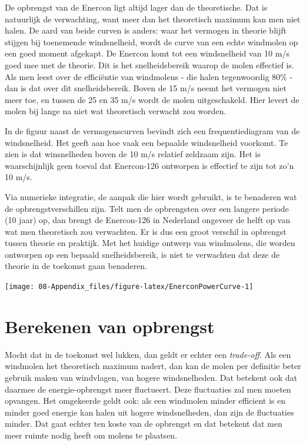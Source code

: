 \documentclass[
  11pt,
  a4paper,
]{book}
\begin{document}
\medskip

De opbrengst van de Enercon ligt altijd lager dan de theoretische. Dat is natuurlijk de verwachting, want meer dan het theoretisch maximum kan men niet halen. De aard van beide curven is anders: waar het vermogen in theorie blijft stijgen bij toenemende windsnelheid, wordt de curve van een echte windmolen op een goed moment afgekapt. De Enercon komt tot een windsnelheid van 10 m/s goed mee met de theorie. Dit is het snelheidsbereik waarop de molen effectief is. Als men leest over de efficiëntie van windmolens - die halen tegenwoordig 80\% - dan is dat over dit snelheidsbereik. Boven de 15 m/s neemt het vermogen niet meer toe, en tussen de 25 en 35 m/s wordt de molen uitgeschakeld. Hier levert de molen bij lange na niet wat theoretisch verwacht zou worden.

\medskip

In de figuur naast de vermogenscurven bevindt zich een frequentiediagram van de windsnelheid. Het geeft aan hoe vaak een bepaalde windsnelheid voorkomt. Te zien is dat winsnelheden boven de 10 m/s relatief zeldzaam zijn. Het is waarschijnlijk geen toeval dat Enercon-126 ontworpen is effectief te zijn tot zo'n 10 m/s.

\medskip

Via numerieke integratie, de aanpak die hier wordt gebruikt, is te benaderen wat de opbrengstverschillen zijn. Telt men de opbrengsten over een langere periode (10 jaar) op, dan brengt de Enercon-126 in Nederland ongeveer de helft op van wat men theoretisch zou verwachten. Er is dus een groot verschil in opbrengst tussen theorie en praktijk. Met het huidige ontwerp van windmolens, die worden ontworpen op een bepaald snelheidsbereik, is niet te verwachten dat deze de theorie in de toekomst gaan benaderen.

\bigskip

\begin{center}\texttt{[image: 08-Appendix\_files/figure-latex/EnerconPowerCurve-1]} \end{center}

\hypertarget{berekenen-van-opbrengst}{%
\section{Berekenen van opbrengst}\label{berekenen-van-opbrengst}}

\bigskip

Mocht dat in de toekomst wel lukken, dan geldt er echter een \emph{trade-off}. Als een windmolen het theoretisch maximum nadert, dan kan de molen per definitie beter gebruik maken van windvlagen, van hogere windsnelheden. Dat betekent ook dat daarmee de energie-opbrengst meer fluctueert. Deze fluctuaties zal men moeten opvangen. Het omgekeerde geldt ook: als een windmolen minder efficient is en minder goed energie kan halen uit hogere windsnelheden, dan zijn de fluctuaties minder. Dat gaat echter ten koste van de opbrengst en dat betekent dat men meer ruimte nodig heeft om molens te plaatsen.
\end{document}
